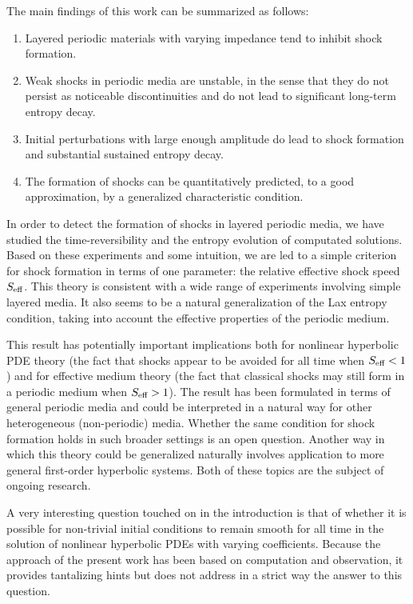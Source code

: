 The main findings of this work can be summarized as follows:
\begin{enumerate}
  \item Layered periodic materials with varying impedance tend to inhibit 
        shock formation.
  \item Weak shocks in periodic media are unstable, in the sense that they
        do not persist as noticeable discontinuities and do not lead to significant 
        long-term entropy decay.
  \item Initial perturbations with large enough amplitude do lead to shock
        formation and substantial sustained entropy decay.
  \item The formation of shocks can be quantitatively predicted, to a good
        approximation, by a generalized characteristic condition.
\end{enumerate}

In order to detect the formation of shocks in layered periodic media, 
we have studied the time-reversibility and the entropy
evolution of computated solutions.  Based on these experiments and
some intuition, we are led to a simple criterion for shock formation
in terms of one parameter: the relative effective shock speed $S_\textup{eff}$.  
This theory is consistent with a wide range of experiments involving simple 
layered media.  It also seems to be a natural
generalization of the Lax entropy condition, taking into account the 
effective properties of the periodic medium.

This result has potentially important implications both for nonlinear
hyperbolic PDE theory (the fact that shocks appear to be avoided for all
time when $S_\textup{eff}<1$) and for effective medium theory (the fact
that classical shocks may still form in a periodic medium when $S_\textup{eff}>1$).
The result has been formulated in terms of general periodic media and could
be interpreted in a natural way for other heterogeneous (non-periodic)
media.  Whether the same condition for shock formation holds in such 
broader settings is an open question.
Another way in which this theory could be generalized naturally involves
application to more general first-order hyperbolic systems.
Both of these topics are the subject of ongoing research.

A very interesting question touched on in the introduction is that of 
whether it is possible for non-trivial initial conditions to remain smooth 
for all time in the solution of nonlinear hyperbolic PDEs with varying 
coefficients.
Because the approach of the present work has been based on computation and 
observation, it provides tantalizing hints but does not address 
in a strict way the answer to this question.


